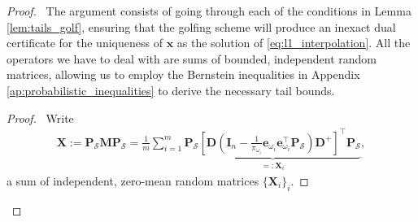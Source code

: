 \begin{proof}
    \pf\ The argument consists of going through each of the conditions in Lemma \ref{lem:tails_golf}, ensuring that the golfing scheme will produce an inexact dual certificate for the uniqueness of $\mathbf{x}$ as the solution of \eqref{eq:l1_interpolation}. All the operators we have to deal with are sums of bounded, independent random matrices, allowing us to employ the Bernstein inequalities in Appendix \ref{ap:probabilistic_inequalities} to derive the necessary tail bounds.

        \begin{proof}
            \pf\ Write
            \begin{align*}
                \mathbf{X} := \mathbf{P}_\mathcal{S} \mathbf{M} \mathbf{P}_\mathcal{S} = \frac{1}{m} \sum_{i=1}^{m} \underbrace{\mathbf{P}_\mathcal{S}\left [ \mathbf{D} \left ( \mathbf{I}_n - \frac{1}{\pi_{\omega_i}}\mathbf{e}_{\omega_i} \mathbf{e}_{\omega_i}^\top \mathbf{P}_\mathcal{S} \right ) \mathbf{D}^{+} \right ]^\top \mathbf{P}_\mathcal{S}}_{=: \mathbf{X}_i},
            \end{align*}
            a sum of independent, zero-mean random matrices $\{\mathbf{X}_i\}_i$.
            \step{}{
}
\end{proof}
\end{proof}
